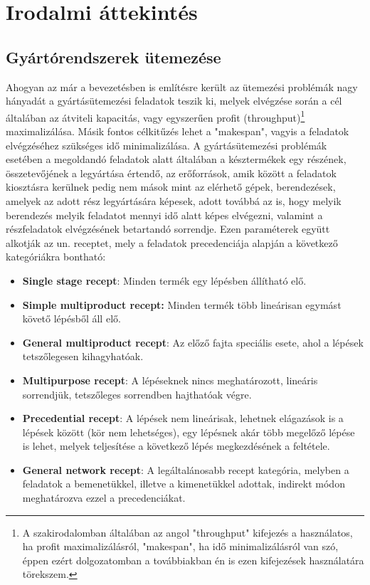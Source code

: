 \chapter{Irodalmi áttekintés} \label{Research}     
\section{Gyártórendszerek ütemezése}
Ahogyan az már a bevezetésben is említésre került az ütemezési problémák nagy hányadát a gyártásütemezési feladatok teszik ki, melyek elvégzése során a cél általában az átviteli kapacitás, vagy egyszerűen profit (throughput)\footnote{A szakirodalomban általában az angol "throughput" kifejezés a használatos, ha profit maximalizálásról, "makespan", ha idő minimalizálásról van szó, éppen ezért dolgozatomban a továbbiakban én is ezen kifejezések használatára törekszem.} maximalizálása.
Másik fontos célkitűzés lehet a "makespan", vagyis a feladatok elvégzéséhez szükséges idő minimalizálása.
A gyártásütemezési problémák esetében a megoldandó feladatok alatt általában a késztermékek egy részének, összetevőjének a legyártása értendő, az erőforrások, amik között a feladatok kiosztásra kerülnek pedig nem mások mint az elérhető gépek, berendezések, amelyek az adott rész legyártására képesek, adott továbbá az is, hogy melyik berendezés melyik feladatot mennyi idő alatt képes elvégezni, valamint a részfeladatok elvégzésének betartandó sorrendje.
Ezen paraméterek együtt alkotják az un. receptet, mely a feladatok precedenciája alapján a következő kategóriákra bontható:
\begin{itemize}
\item[]\textbf{Single stage recept}: Minden termék egy lépésben állítható elő. 
\item[]\textbf{Simple multiproduct recept:} Minden termék több lineárisan egymást követő lépésből áll elő.
\item[]\textbf{General multiproduct recept}: Az előző fajta speciális esete, ahol a lépések tetszőlegesen kihagyhatóak.
\item[]\textbf{Multipurpose recept}: A lépéseknek nincs meghatározott, lineáris sorrendjük, tetszőleges sorrendben hajthatóak végre.
\item[]\textbf{Precedential recept}: A lépések nem lineárisak, lehetnek elágazások is a lépések között (kör nem lehetséges), egy lépésnek akár több megelőző lépése is lehet, melyek teljesítése a következő lépés megkezdésének a feltétele.
\item[]\textbf{General network recept}: A legáltalánosabb recept kategória, melyben a feladatok a bemenetükkel, illetve a kimenetükkel adottak, indirekt módon meghatározva ezzel a precedenciákat.\cite{hegyhati2010} 
\end{itemize}
